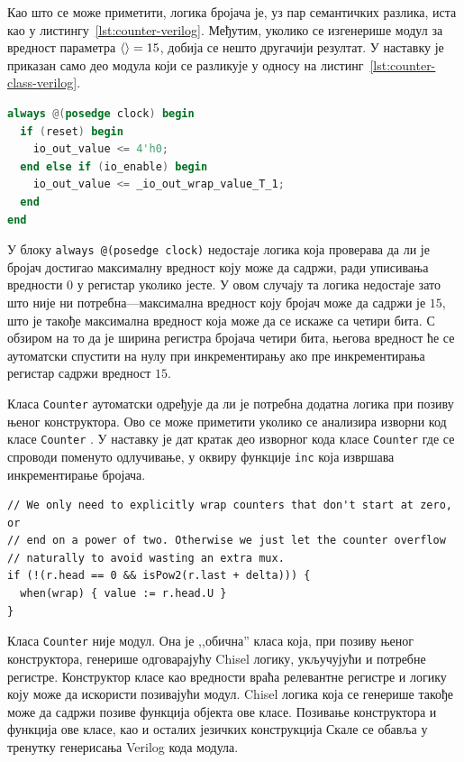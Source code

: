 \documentclass[master]{finthesis}
\newcommand*{\correctmath}[1]{%
    \ifcsname mathCorrectionFor#1\endcsname%
        \csname mathCorrectionFor#1\endcsname%
    \else%
        #1%
    \fi%
}
\newcommand*{\mfield}[1]{{\langle\correctmath{#1}\/\rangle}}
\newcommand*{\prog}[1]{\texttt{#1}}
\newcommand*{\func}[1]{\prog{#1}}
\begin{document}
Као што се може приметити, логика бројача је, уз пар семантичких разлика, иста као у листингу~\ref{lst:counter-verilog}. Међутим, уколико се изгенерише модул за вредност параметра $\mfield{max} = 15$, добија се нешто другачији резултат. У наставку је приказан само део модула који се разликује у односу на листинг~\ref{lst:counter-class-verilog}.

\begin{lstlisting}[language=Verilog, caption={Део од интереса изгенерисаног Verilog кода модула бројача за вредност параметра $\mfield{max} = 15$.}, label={lst:counter-class-alternative-verilog}]
always @(posedge clock) begin
  if (reset) begin
    io_out_value <= 4'h0;
  end else if (io_enable) begin
    io_out_value <= _io_out_wrap_value_T_1;
  end
end
\end{lstlisting}

У блоку \prog{always @(posedge clock)} недостаје логика која проверава да ли је бројач достигао максималну вредност коју може да садржи, ради уписивања вредности $0$ у регистар уколико јесте. У овом случају та логика недостаје зато што није ни потребна---максимална вредност коју бројач може да садржи је $15$, што је такође максимална вредност која може да се искаже са четири бита. С обзиром на то да је ширина регистра бројача четири бита, његова вредност ће се аутоматски спустити на нулу при инкрементирању ако пре инкрементирања регистар садржи вредност $15$.

Класа \prog{Counter} аутоматски одређује да ли је потребна додатна логика при позиву њеног конструктора. Ово се може приметити уколико се анализира изворни код класе \prog{Counter} \cite{counterimplementation}. У наставку је дат кратак део изворног кода класе \prog{Counter} где се спроводи поменуто одлучивање, у оквиру функције \func{inc} која извршава инкрементирање бројача.

\begin{lstlisting}[style=Chisel, caption={Део реализације класе \prog{Counter} у којем се одлучује да ли је потребна додатна логика за постављање вредности бројача на почетну након што достигне крајњу.}]
// We only need to explicitly wrap counters that don't start at zero, or
// end on a power of two. Otherwise we just let the counter overflow
// naturally to avoid wasting an extra mux.
if (!(r.head == 0 && isPow2(r.last + delta))) {
  when(wrap) { value := r.head.U }
}
\end{lstlisting}

Класа \prog{Counter} није модул. Она је ,,обична'' класа која, при позиву њеног конструктора, генерише одговарајућу Chisel логику, укључујући и потребне регистре. Конструктор класе као вредности враћа релевантне регистре и логику коју може да искористи позивајући модул. Chisel логика која се генерише такође може да садржи позиве функција објекта ове класе. Позивање конструктора и функција ове класе, као и осталих језичких конструкција Скале се обавља у тренутку генерисања Verilog кода модула.
\end{document}
